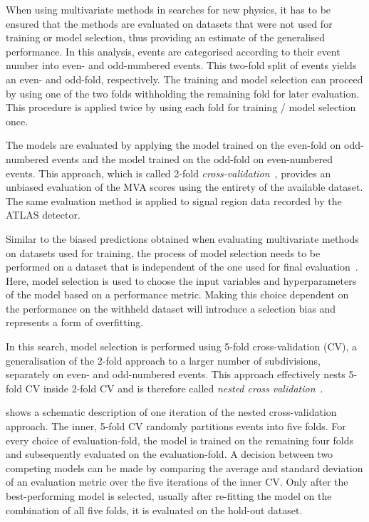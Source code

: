 When using multivariate methods in searches for new physics, it has to
be ensured that the methods are evaluated on datasets that were not
used for training or model selection,
thus providing an estimate of the generalised performance. In
this analysis, events are categorised according to their event number
into even- and odd-numbered events. This two-fold split of events
yields an even- and odd-fold, respectively. The training and model
selection can proceed by using one of the two folds withholding the
remaining fold for later evaluation. This procedure is applied twice
by using each fold for training / model selection once.

The models are evaluated by applying the model trained on the
even-fold on odd-numbered events and the model trained on the odd-fold
on even-numbered events. This approach, which is called 2-fold
\emph{cross-validation}~\cite{hastie09,bishop06}, provides an unbiased
evaluation of the MVA scores using the entirety of the available
dataset. The same evaluation method is applied to signal region data
recorded by the ATLAS detector.

Similar to the biased predictions obtained when evaluating
multivariate methods on datasets used for training, the process of
model selection needs to be performed on a dataset that is independent
of the one used for final evaluation~\cite{cawley10}. Here, model
selection is used to choose the input variables and hyperparameters of
the model based on a performance metric. Making this choice dependent
on the performance on the withheld dataset will introduce a selection
bias and represents a form of overfitting.

In this search, model selection is performed using 5-fold
cross-validation (CV), a generalisation of the 2-fold approach to a
larger number of subdivisions, separately on even- and odd-numbered
events. This approach effectively nests 5-fold CV inside 2-fold CV and
is therefore called \emph{nested cross
  validation}~\cite{cawley10,stone74}.

 shows a schematic description of one
iteration of the nested cross-validation approach. The inner, 5-fold
CV randomly partitions events into five folds. For every choice of
evaluation-fold, the model is trained on the remaining four folds and
subsequently evaluated on the evaluation-fold. A decision between two
competing models can be made by comparing the average and standard
deviation of an evaluation metric over the five iterations of the inner
CV. Only after the best-performing model is selected, usually after
re-fitting the model on the combination of all five folds, it is
evaluated on the hold-out dataset.

